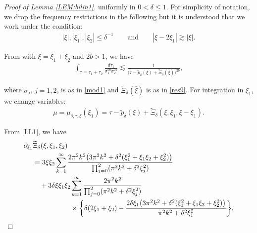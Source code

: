 \documentclass[letterpaper, 11pt,  reqno]{amsart}
\DeclareMathOperator*{\intt}{\int}
\newcommand{\1}{\hspace{0.5mm}\textup{I}\hspace{0.5mm}}
\newcommand{\noi}{\noindent}
\newcommand{\dl}{\delta}
\newcommand{\s}{\sigma}
\newcommand{\wt}{\widetilde}
\newcommand{\dd}{\partial}
\newcommand{\les}{\lesssim}
\newcommand{\ges}{\gtrsim}
\newcommand{\jb}[1]
{\langle #1 \rangle}
\numberwithin{equation}{section}
\numberwithin{theorem}{section}
\begin{document}
\begin{proof}[Proof of Lemma \ref{LEM:bilin1}]
\noi
uniformly in $0 < \dl \le1$.
For simplicity of notation, 
we drop the frequency restrictions in the following
but it is understood that we work under the condition: 
\begin{align}
|\xi|,  |\xi_1|, |\xi_2|\le   \dl^{-1}
 \qquad\text{and}
\qquad 
 |\xi - 2\xi_1|\ges |\xi|.
\label{BD1a}
\end{align}



From \cite[Lemma 2.3]{KPV96}
with $\xi = \xi_1 + \xi_2$ and $2b > 1$, we have 
\begin{align}
\intt_{\tau = \tau_1 + \tau_2}
\frac{d\tau_1 }{\s_1^{2b}
\s_2^{2b}}
\les 
\frac{1}{\jb{\tau  - \wt p_\dl(\xi) + \wt \Xi_\dl(\bar \xi)}^{2b}}, 
\label{BD2}
\end{align}

\noi
where $\s_j$, $j = 1, 2$, is as in \eqref{mod1} and $\wt \Xi_\dl(\bar \xi)$ is as in \eqref{res9}.
For integration in $\xi_1$, 
we change variables:
\begin{align}
\mu = \mu_{\dl, \tau, \xi}(\xi_1) = \tau  - \wt p_\dl(\xi) + \wt \Xi_\dl(\xi, \xi_1, \xi - \xi_1).
\label{BD3}
\end{align}

\noi
From
\eqref{LL1}, we have
\begin{align}
\begin{split}
 \dd_{\xi_1} & \wt \Xi_\dl(\xi, \xi_1,  \xi_2) \\
& = 3\xi  \xi_2
 \sum_{k=1}^{\infty}   
 \frac{2 \pi^2 k^2 \big(3 \pi^2 k^2 + \dl^2(\xi_1^2 + \xi_1 \xi_2 + \xi_2^2)\big)}
 {\prod_{j = 0}^2(\pi^2 k^2 +\dl^2\xi_j^2)}\\
& \quad +  3\dl \xi \xi_1 \xi_2
 \sum_{k=1}^{\infty}   
 \frac{2 \pi^2 k^2 }
 {\prod_{j = 0}^2(\pi^2 k^2 +\dl^2\xi_j^2)}\\
& \hphantom{XXXXXX} \times
 \bigg\{ \dl (2\xi_1 + \xi_2) 
- \frac{  2\dl \xi_1  \big(3 \pi^2 k^2 + \dl^2(\xi_1^2 + \xi_1 \xi_2 + \xi_2^2)\big)}
 {\pi^2 k^2 +\dl^2\xi_1^2}\bigg\}. 
\end{split}
\label{BX1}
\end{align}






\end{proof}
\end{document}
